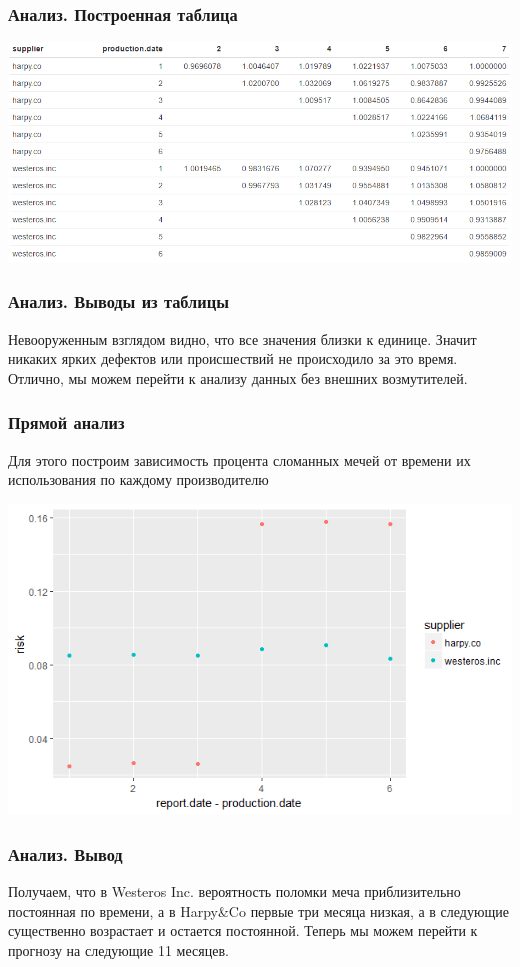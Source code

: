 \documentclass{beamer}
\begin{document}
\begin{frame}
    \frametitle{Анализ. Построенная таблица}
    
    \includegraphics[scale = 0.46]{table.PNG}
    
\end{frame}

\begin{frame}
    \frametitle{Анализ. Выводы из таблицы}
    Невооруженным взглядом видно, что все значения близки к единице. Значит никаких ярких дефектов или происшествий не происходило за это время. Отлично, мы можем перейти к анализу данных без внешних возмутителей.
    
\end{frame}

\begin{frame}
    \frametitle{Прямой анализ}
    Для этого построим зависимость процента сломанных мечей от времени их использования по каждому производителю
    
    \includegraphics[scale = 0.5]{risk.png}
    
\end{frame}

\begin{frame}
    \frametitle{Анализ. Вывод}
    
    Получаем, что в Westeros Inc. вероятность поломки меча приблизительно постоянная по времени, а в Harpy\&Co первые три месяца низкая, а в следующие существенно возрастает и остается постоянной. Теперь мы можем перейти к прогнозу на следующие 11 месяцев.
\end{frame}
\end{document}
